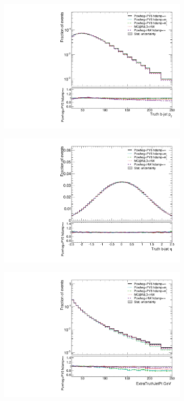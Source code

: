 \begin{figure}
\centering
\begin{subfigure}[]{0.45\textwidth}
\includegraphics[width=\textwidth]{fig/MCComp/NLO/TruthBJetPt.pdf}
\end{subfigure}
\begin{subfigure}[]{0.45\textwidth}
\includegraphics[width=\textwidth]{fig/MCComp/NLO/TruthBJetEta.pdf}
\end{subfigure}
\begin{subfigure}[]{0.45\textwidth}
\includegraphics[width=\textwidth]{fig/MCComp/NLO/ExtraTruthJetPt.pdf}

\end{subfigure}
\end{figure}
